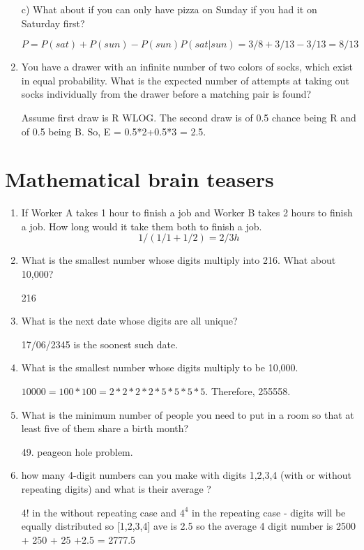 \documentclass{article}
\begin{document}
\begin{enumerate}
    c) What about if you can only have pizza on Sunday if you had it on Saturday first?

    $P = P(sat) + P(sun) - P(sun)P(sat|sun) = 3/8+3/13-3/13 = 8/13$

     \item You have a drawer with an infinite number of two colors of socks, which exist in equal probability. What is the expected number of attempts at taking out socks individually from the drawer before a matching pair is found?

     Assume first draw is R WLOG. The second draw is of 0.5 chance being R and of 0.5 being B. So, E = 0.5*2+0.5*3 = 2.5. 

    
\end{enumerate}
\section{Mathematical brain teasers}
\begin{enumerate}

    \item If Worker A takes 1 hour to finish a job and Worker B takes 2 hours to finish a job. How long would it take them both to finish a job.
    $$1/(1/1 + 1/2) = 2/3 h$$


    \item What is the smallest number whose digits multiply into 216. What about 10,000?

    216


    \item What is the next date whose digits are all unique?

    17/06/2345 is the soonest such date.

    \item What is the smallest number whose digits multiply to be 10,000.
    
    $10000 = 100*100=2*2*2*2*5*5*5*5$. Therefore, 255558.

    \item What is the minimum number of people you need to put in a room so that at least five of them share a birth month?

    49. peageon hole problem.

    \item how many 4-digit numbers can you make with digits 1,2,3,4 (with or without repeating digits) and what is their average ?

    4! in the without repeating case and $4^4$ in the repeating case - digits will be equally distributed so [1,2,3,4] ave is 2.5 so the average 4 digit number is 2500 + 250 + 25 +2.5 = 2777.5

\end{enumerate}
\end{document}
